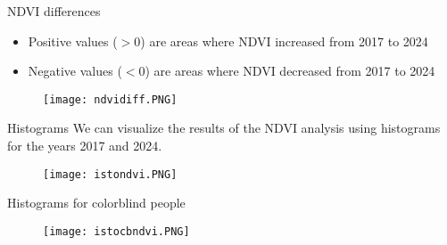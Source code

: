 \documentclass{beamer}
\begin{document}
\begin{frame}{NDVI differences}
    \begin{itemize}
        \item Positive values ($> 0$) are areas where NDVI increased from 2017 to 2024
        \item Negative values ($< 0$) are areas where NDVI decreased from 2017 to 2024
    \end{itemize}

     
\vspace{-0.3cm}
     \begin{figure}
         \centering
         \texttt{[image: ndvidiff.PNG]}
         \label{fig:enter-label}
     \end{figure}
     
\end{frame}

\begin{frame}{Histograms }
We can visualize the results of the NDVI analysis using histograms for the years 2017 and 2024.

     
\vspace{-0.3cm}
     \begin{figure}
         \centering
         \texttt{[image: istondvi.PNG]}
         \label{fig:enter-label}
     \end{figure}

\end{frame}

\begin{frame}{}
Histograms for colorblind people 

    
 \vspace{-0.3cm}
 \begin{figure}
     \centering
     \texttt{[image: istocbndvi.PNG]}
     \label{fig:enter-label}
 \end{figure}
\end{frame}
\end{document}
